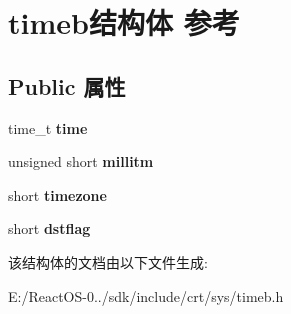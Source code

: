 \hypertarget{structtimeb}{}\section{timeb结构体 参考}
\label{structtimeb}
\subsection*{Public 属性}
\begin{DoxyCompactItemize}
\item 
\mbox{\label{structtimeb_a6f298f9fb1327aba639d457f2989b859}} 
time\+\_\+t {\bfseries time}
\item 
\mbox{\label{structtimeb_aa459454ab48c84566d6b1fa72bafebe7}} 
unsigned short {\bfseries millitm}
\item 
\mbox{\label{structtimeb_aa1c6a12ca2a9150c5002bdfb0331bf0b}} 
short {\bfseries timezone}
\item 
\mbox{\label{structtimeb_a951ede614d33eed486224c381df15f4e}} 
short {\bfseries dstflag}
\end{DoxyCompactItemize}


该结构体的文档由以下文件生成\+:\begin{DoxyCompactItemize}
\item 
E\+:/\+React\+O\+S-\/0../sdk/include/crt/sys/timeb.\+h\end{DoxyCompactItemize}
